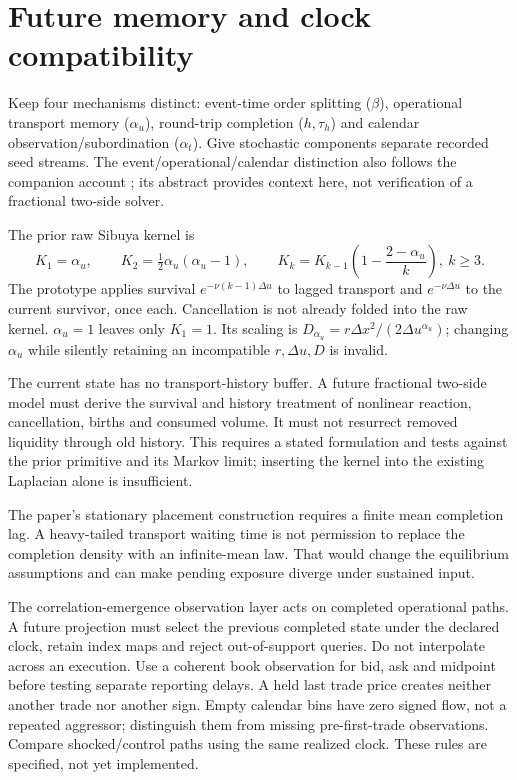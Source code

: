 \documentclass[11pt,a4paper]{article}
\newcommand{\du}{\Delta u}\newcommand{\dx}{\Delta x}
\begin{document}
\newpage
\section{Future memory and clock compatibility}
Keep four mechanisms distinct: event-time order splitting ($\beta$),
operational transport memory ($\alpha_u$), round-trip completion ($h,\tau_h$)
and calendar observation/subordination ($\alpha_t$). Give stochastic
components separate recorded seed streams. The event/operational/calendar
distinction also follows the companion account \cite{clocks}; its abstract
provides context here, not verification of a fractional two-side solver.

The prior raw Sibuya kernel is
\[
 K_1=\alpha_u,\qquad K_2=\tfrac12\alpha_u(\alpha_u-1),\qquad
 K_k=K_{k-1}\left(1-\frac{2-\alpha_u}{k}\right),\ k\geq3.
\]
The prototype applies survival $e^{-\nu(k-1)\du}$ to lagged transport
and $e^{-\nu\du}$ to the current survivor, once each. Cancellation is not
already folded into the raw kernel. $\alpha_u=1$ leaves only $K_1=1$.
Its scaling is $D_{\alpha_u}=r\dx^2/(2\du^{\alpha_u})$; changing
$\alpha_u$ while silently retaining an incompatible $r,\du,D$ is invalid.

The current state has no transport-history buffer. A future fractional
two-side model must derive the survival and history treatment of nonlinear
reaction, cancellation, births and consumed volume. It must not resurrect
removed liquidity through old history. This requires a stated formulation
and tests against the prior primitive and its Markov limit; inserting the
kernel into the existing Laplacian alone is insufficient.

The paper's stationary placement construction requires a finite mean
completion lag. A heavy-tailed transport waiting time is not permission to
replace the completion density with an infinite-mean law. That would change
the equilibrium assumptions and can make pending exposure diverge under
sustained input.

The correlation-emergence observation layer acts on completed operational
paths. A future projection must select the previous completed state under
the declared clock, retain index maps and reject out-of-support queries.
Do not interpolate across an execution. Use a coherent book observation for
bid, ask and midpoint before testing separate reporting delays. A held last
trade price creates neither another trade nor another sign. Empty calendar
bins have zero signed flow, not a repeated aggressor; distinguish them from
missing pre-first-trade observations. Compare shocked/control paths using
the same realized clock. These rules are specified, not yet implemented.
\end{document}
